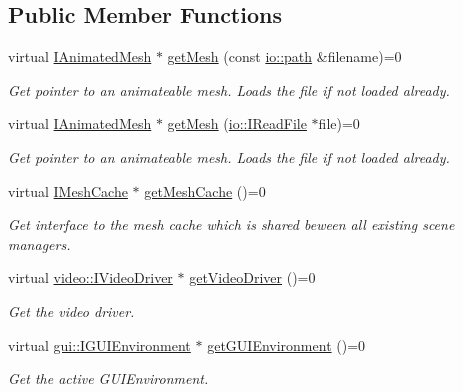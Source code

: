 \subsection*{Public Member Functions}
\begin{DoxyCompactItemize}
\item 
virtual \hyperlink{classirr_1_1scene_1_1IAnimatedMesh}{I\+Animated\+Mesh} $\ast$ \hyperlink{classirr_1_1scene_1_1ISceneManager_a63894c3f3d46cfc385116f1705935e03}{get\+Mesh} (const \hyperlink{namespaceirr_1_1io_a6468281622ce3a1c46b72e19f32dded5}{io\+::path} \&filename)=0
\begin{DoxyCompactList}\small\item\em Get pointer to an animateable mesh. Loads the file if not loaded already. \end{DoxyCompactList}\item 
virtual \hyperlink{classirr_1_1scene_1_1IAnimatedMesh}{I\+Animated\+Mesh} $\ast$ \hyperlink{classirr_1_1scene_1_1ISceneManager_af0ff82d7bac969d6a30f67c7b1fa0c46}{get\+Mesh} (\hyperlink{classirr_1_1io_1_1IReadFile}{io\+::\+I\+Read\+File} $\ast$file)=0
\begin{DoxyCompactList}\small\item\em Get pointer to an animateable mesh. Loads the file if not loaded already. \end{DoxyCompactList}\item 
virtual \hyperlink{classirr_1_1scene_1_1IMeshCache}{I\+Mesh\+Cache} $\ast$ \hyperlink{classirr_1_1scene_1_1ISceneManager_a45d89c816e33abe0e77eb063d7ce58a8}{get\+Mesh\+Cache} ()=0
\begin{DoxyCompactList}\small\item\em Get interface to the mesh cache which is shared beween all existing scene managers. \end{DoxyCompactList}\item 
virtual \hyperlink{classirr_1_1video_1_1IVideoDriver}{video\+::\+I\+Video\+Driver} $\ast$ \hyperlink{classirr_1_1scene_1_1ISceneManager_afde082160205a8faab44cd5b61e3745c}{get\+Video\+Driver} ()=0
\begin{DoxyCompactList}\small\item\em Get the video driver. \end{DoxyCompactList}\item 
virtual \hyperlink{classirr_1_1gui_1_1IGUIEnvironment}{gui\+::\+I\+G\+U\+I\+Environment} $\ast$ \hyperlink{classirr_1_1scene_1_1ISceneManager_ad887536e9cc41d0670364f9f0a0f4510}{get\+G\+U\+I\+Environment} ()=0
\begin{DoxyCompactList}\small\item\em Get the active G\+U\+I\+Environment. \end{DoxyCompactList}\item 

\end{DoxyCompactItemize}
